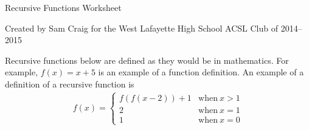 \documentclass[12pt,letterpaper,fleqn]{article}
\begin{document}
\begin{center}
  Recursive Functions Worksheet

  Created by Sam Craig for the West Lafayette High School ACSL Club of 2014--2015
\end{center}

Recursive functions below are defined as they would be in mathematics.
For example, $f(x) = x + 5$ is an example of a function definition.
An example of a definition of a recursive function is
\begin{align*}
  f(x) =
  \begin{cases}
    f(f(x-2)) + 1 & \text{when}\ x > 1 \\
    2 & \text{when}\ x = 1 \\
    1 & \text{when}\ x = 0
  \end{cases}
\end{align*}
\end{document}
